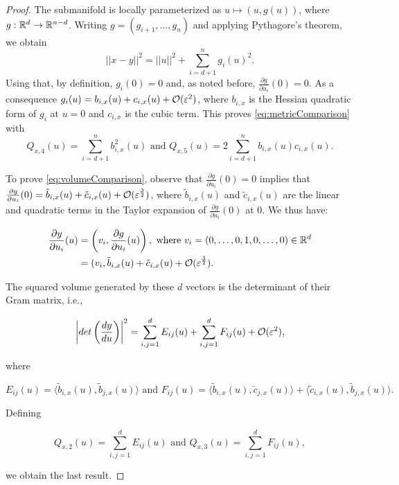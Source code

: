 \begin{proof}
The submanifold is locally parameterized as $u\mapsto(u,g(u))$, where $g:\mathbb{R}^d\rightarrow\mathbb{R}^{n-d}$. Writing $g=(g_{i+1},\dots,g_n)$ and applying Pythagore's theorem, we obtain
\begin{equation*}
||x-y||^2=||u||^2+\sum_{i=d+1}^n g_i(u)^2.
\end{equation*}
Using that, by definition, $g_i(0)=0$ and, as noted before, $\frac{\partial g}{\partial u_i}(0)=0$. As a consequence $g_i(u)=b_{i,x}(u)+c_{i,x}(u)+\mathcal{O}(\varepsilon^2)$, where $b_{i,x}$ is the Hessian quadratic form of $g_i$ at $u=0$ and $c_{i,x}$ is the cubic term. This proves \eqref{eq:metricComparison} with
\begin{equation*}
Q_{x,4}(u)=\sum_{i=d+1}^n b_{i,x}^2(u) \text{ and } Q_{x,5}(u)=2\sum_{i=d+1}^n b_{i,x}(u)c_{i,x}(u).
\end{equation*}

To prove \eqref{eq:volumeComparison}, observe that $\frac{\partial g}{\partial u_i}(0)=0$ implies that $\frac{\partial g}{\partial u_i}(0)=\tilde{b}_{i,x}(u)+\tilde{c}_{i,x}(u)+\mathcal{O}(\varepsilon^\frac{3}{2})$, where $\tilde{b}_{i,x}(u)$ and $\tilde{c}_{i,x}(u)$ are the linear and quadratic terms in the Taylor expansion of $\frac{\partial g}{\partial u_i}(0)$ at $0$. We thus have:

\begin{equation*}\begin{aligned}
\frac{\partial y}{\partial u_i}(u)&=\left(v_i,\frac{\partial g}{\partial u_i}(u)\right), \text{ where } v_i=(0,\dots,0,1,0,\dots,0)\in\mathbb{R}^d \\
&=(v_i,\tilde{b}_{i,x}(u)+\tilde{c}_{i,x}(u)+\mathcal{O}(\varepsilon^\frac{3}{2}).
\end{aligned}\end{equation*}

The squared volume generated by these $d$ vectors is the determinant of their Gram matrix, i.e.,

\begin{equation*}
\left| det\left(\frac{dy}{du} \right)\right|^2=\sum_{i,j=1}^d E_{ij}(u)+\sum_{i,j=1}^d F_{ij}(u)+\mathcal{O}(\varepsilon^2),
\end{equation*}

where

\begin{equation*}
E_{ij}(u)=\langle \tilde{b}_{i,x}(u),\tilde{b}_{j,x}(u)\rangle \text{ and } F_{ij}(u)=\langle \tilde{b}_{i,x}(u),\tilde{c}_{j,x}(u)\rangle + \langle \tilde{c}_{i,x}(u),\tilde{b}_{j,x}(u)\rangle.
\end{equation*}

Defining

\begin{equation*}
Q_{x,2}(u)=\sum_{i,j=1}^d E_{ij}(u) \text{ and } Q_{x,3}(u)=\sum_{i,j=1}^d F_{ij}(u),
\end{equation*}

we obtain the last result.
\end{proof}



